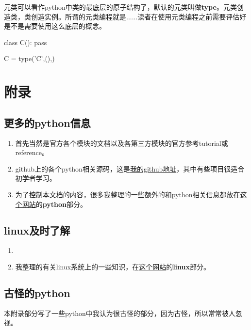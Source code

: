 \documentclass[12pt,oneside]{book}
\begin{document}
\begin{common-format}
元类可以看作python中类的最底层的原子结构了，默认的元类叫做\textbf{type}。元类创造类，类创造实例。所谓的元类编程就是......读者在使用元类编程之前需要评估好是不是需要使用这么底层的概念。

\begin{tcbpython}[]
class C():
    pass
\end{tcbpython}

\begin{tcbpython}[]
C = type('C',(),{})
\end{tcbpython}







\appendix
\part{附录}

\chapter{更多的python信息}


\begin{enumerate}
\item 首先当然是官方各个模块的文档以及各第三方模块的官方参考tutorial或reference。
\item github上的各个python相关源码，这是\href{https://github.com/a358003542}{我的github地址}，其中有些项目很适合初学者学习。
\item 为了控制本文档的内容，很多我整理的一些额外的和python相关信息都放在\href{http://www.cdwanze.org/}{这个网站}的\textbf{python}部分。
\end{enumerate}


\chapter{linux及时了解}
\begin{enumerate}
\item 
\item 我整理的有关linux系统上的一些知识，在\href{http://www.cdwanze.org/}{这个网站}的\textbf{linux}部分。
\end{enumerate}


\chapter{古怪的python}
本附录部分写了一些python中我认为很古怪的部分，因为古怪，所以常常被人忽视。


\end{common-format}
\end{document}
